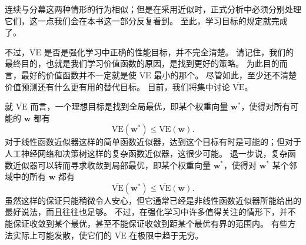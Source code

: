 \documentclass[UTF8, 12pt, fontset=fandol, oneside]{ctexart}
\begin{document}
\begin{center}
\end{center}

连续与分幕这两种情形的行为相似；但是在采用近似时，正式分析中必须分别处理它们，这一点我们会在本书这一部分反复看到。
至此，学习目标的规定就完成了。

不过，$\overline{\mathrm{VE}}$ 是否是强化学习中正确的性能目标，并不完全清楚。
请记住，我们的最终目的，也就是我们学习价值函数的原因，是找到更好的策略。
为此目的而言，最好的价值函数并不一定就是使 $\overline{\mathrm{VE}}$ 最小的那个。
尽管如此，至少还不清楚价值预测还有什么更有用的替代目标。
目前，我们将集中讨论 $\overline{\mathrm{VE}}$。

就 $\overline{\mathrm{VE}}$ 而言，一个理想目标是找到全局最优，即某个权重向量 $\mathbf{w}^*$，使得对所有可能的 $\mathbf{w}$ 都有
\[
\overline{\mathrm{VE}}(\mathbf{w}^*)\le \overline{\mathrm{VE}}(\mathbf{w}).
\]
对于线性函数近似器这样的简单函数近似器，达到这个目标有时是可能的；但对于人工神经网络和决策树这样的复杂函数近似器，这很少可能。
退一步说，复杂函数近似器可以转而寻求收敛到局部最优，即某个权重向量 $\mathbf{w}^*$，使得对 $\mathbf{w}^*$ 某个邻域中的所有 $\mathbf{w}$ 都有
\[
\overline{\mathrm{VE}}(\mathbf{w}^*)\le \overline{\mathrm{VE}}(\mathbf{w}).
\]
虽然这样的保证只能稍微令人安心，但它通常已经是非线性函数近似器所能给出的最好说法，而且往往也足够。
不过，在强化学习中许多值得关注的情形下，并不能保证收敛到某个最优，甚至不能保证收敛到距某个最优有界的范围内。
有些方法实际上可能发散，使它们的 $\overline{\mathrm{VE}}$ 在极限中趋于无穷。
\end{document}
